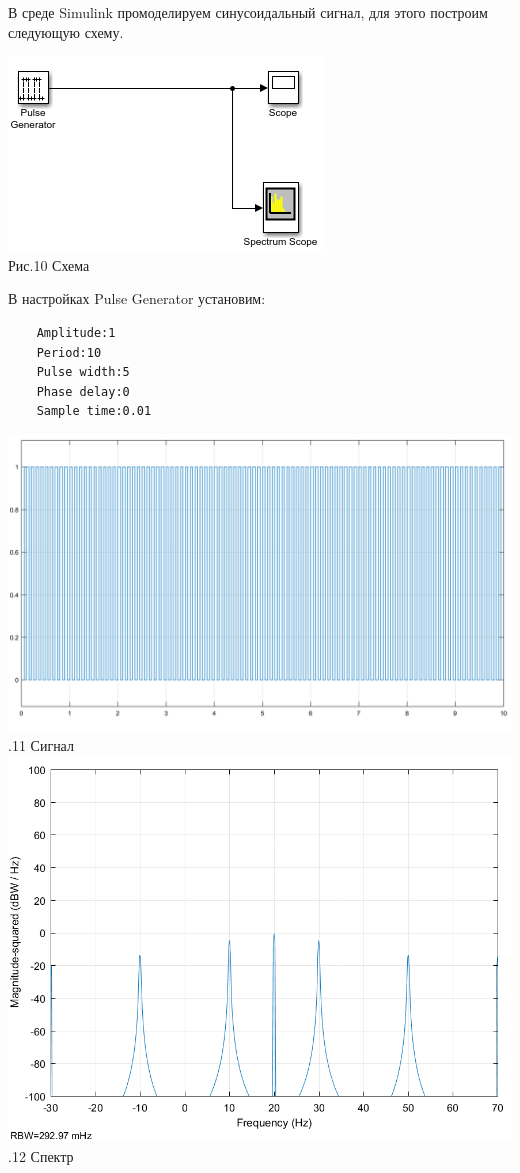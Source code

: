 \documentclass[a4paper]{article}
\begin{document}
В среде Simulink промоделируем синусоидальный сигнал, для этого построим следующую схему.

\begin{center}
	\includegraphics[scale = 0.5]{pictures/prm.png} 
	\\ Рис.10 Схема
\end{center} 
	
В настройках Pulse Generator установим:
\begin{verbatim}
	Amplitude:1
	Period:10
	Pulse width:5
	Phase delay:0
	Sample time:0.01
\end{verbatim}

	\center\includegraphics[scale = 0.5]{pictures/simulink.png} 
	\\ .11 Сигнал
	\center\includegraphics[scale = 0.5]{pictures/simulink_spectr.png} 
	\\ .12 Спектр
 
\end{document}
